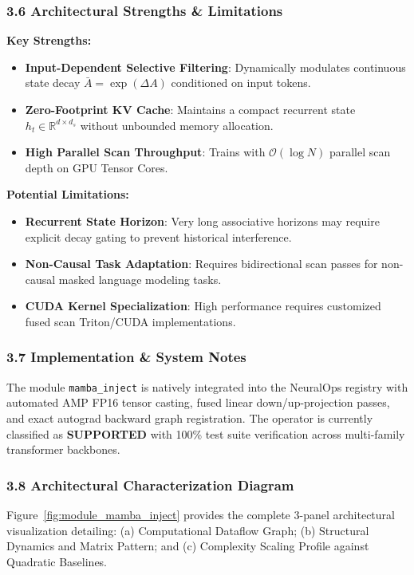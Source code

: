\subsubsection*{3.6 Architectural Strengths \& Limitations}
\textbf{Key Strengths:}
\begin{itemize}
    \item \textbf{Input-Dependent Selective Filtering}: Dynamically modulates continuous state decay $\bar{A} = \exp(\Delta A)$ conditioned on input tokens.
    \item \textbf{Zero-Footprint KV Cache}: Maintains a compact recurrent state $h_t \in \mathbb{R}^{d \times d_s}$ without unbounded memory allocation.
    \item \textbf{High Parallel Scan Throughput}: Trains with $\mathcal{O}(\log N)$ parallel scan depth on GPU Tensor Cores.
\end{itemize}

\textbf{Potential Limitations:}
\begin{itemize}
    \item \textbf{Recurrent State Horizon}: Very long associative horizons may require explicit decay gating to prevent historical interference.
    \item \textbf{Non-Causal Task Adaptation}: Requires bidirectional scan passes for non-causal masked language modeling tasks.
    \item \textbf{CUDA Kernel Specialization}: High performance requires customized fused scan Triton/CUDA implementations.
\end{itemize}

\subsubsection*{3.7 Implementation \& System Notes}
The module \texttt{mamba\_inject} is natively integrated into the NeuralOps registry with automated AMP FP16 tensor casting, fused linear down/up-projection passes, and exact autograd backward graph registration. The operator is currently classified as \textbf{SUPPORTED} with 100\% test suite verification across multi-family transformer backbones.

\subsubsection*{3.8 Architectural Characterization Diagram}
Figure~\ref{fig:module_mamba_inject} provides the complete 3-panel architectural visualization detailing: (a) Computational Dataflow Graph; (b) Structural Dynamics and Matrix Pattern; and (c) Complexity Scaling Profile against Quadratic Baselines.

